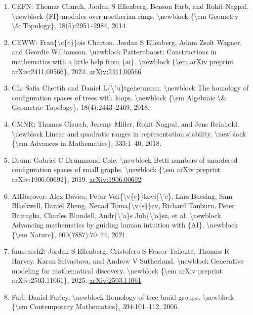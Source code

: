 \documentclass[11pt]{article}
\begin{document}
\begin{enumerate}[leftmargin=*]
  \item CEFN: Thomas Church, Jordan S Ellenberg, Benson Farb, and Rohit Nagpal. \textbackslash{}newblock \{FI\}-modules over noetherian rings. \textbackslash{}newblock \{\textbackslash{}em Geometry \textbackslash{}\& Topology\}, 18(5):2951--2984, 2014.
  \item CEWW: Fran\{\textbackslash{}c\{c\}\}ois Charton, Jordan S Ellenberg, Adam Zsolt Wagner, and Geordie Williamson. \textbackslash{}newblock Patternboost: Constructions in mathematics with a little help from \{ai\}. \textbackslash{}newblock \{\textbackslash{}em arXiv preprint arXiv:2411.00566\}, 2024. \href{https://arxiv.org/abs/2411.00566}{arXiv:2411.00566}
  \item CL: Safia Chettih and Daniel L\{\textbackslash{}"u\}tgehetmann. \textbackslash{}newblock The homology of configuration spaces of trees with loops. \textbackslash{}newblock \{\textbackslash{}em Algebraic \textbackslash{}\& Geometric Topology\}, 18(4):2443--2469, 2018.
  \item CMNR: Thomas Church, Jeremy Miller, Rohit Nagpal, and Jens Reinhold. \textbackslash{}newblock Linear and quadratic ranges in representation stability. \textbackslash{}newblock \{\textbackslash{}em Advances in Mathematics\}, 333:1--40, 2018.
  \item Drum: Gabriel C Drummond-Cole. \textbackslash{}newblock Betti numbers of unordered configuration spaces of small graphs. \textbackslash{}newblock \{\textbackslash{}em arXiv preprint arXiv:1906.00692\}, 2019. \href{https://arxiv.org/abs/1906.00692}{arXiv:1906.00692}
  \item AIDiscover: Alex Davies, Petar Veli\{\textbackslash{}v\{c\}\}kovi\{\textbackslash{}'c\}, Lars Buesing, Sam Blackwell, Daniel Zheng, Nenad Toma\{\textbackslash{}v\{s\}\}ev, Richard Tanburn, Peter Battaglia, Charles Blundell, Andr\{\textbackslash{}'a\}s Juh\{\textbackslash{}'a\}sz, et al. \textbackslash{}newblock Advancing mathematics by guiding human intuition with \{AI\}. \textbackslash{}newblock \{\textbackslash{}em Nature\}, 600(7887):70--74, 2021.
  \item funsearch2: Jordan S Ellenberg, Cristofero S Fraser-Taliente, Thomas R Harvey, Karan Srivastava, and Andrew V Sutherland. \textbackslash{}newblock Generative modeling for mathematical discovery. \textbackslash{}newblock \{\textbackslash{}em arXiv preprint arXiv:2503.11061\}, 2025. \href{https://arxiv.org/abs/2503.11061}{arXiv:2503.11061}
  \item Farl: Daniel Farley. \textbackslash{}newblock Homology of tree braid groups. \textbackslash{}newblock \{\textbackslash{}em Contemporary Mathematics\}, 394:101--112, 2006.

\end{enumerate}
\end{document}
